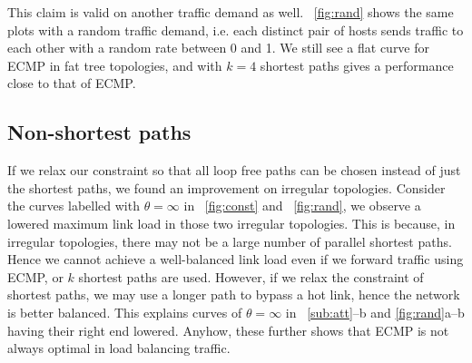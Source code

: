 \documentclass[conference]{IEEEtran}
\begin{document}
This claim is valid on another traffic demand as well.
\figurename~\ref{fig:rand} shows the same plots with a random traffic demand,
i.e. each distinct pair of hosts sends traffic to each other with a random rate
between 0 and 1. We still see a flat curve for ECMP in fat tree topologies, and
with $k=4$ shortest paths gives a performance close to that of ECMP.

%

\subsection{Non-shortest paths}\label{sub:nonshort}

If we relax our constraint so that all loop free paths can be chosen instead of
just the shortest paths, we found an improvement on irregular topologies.
Consider the curves labelled with $\theta=\infty$ in
\figurename~\ref{fig:const} and \figurename~\ref{fig:rand}, we observe a
lowered maximum link load in those two irregular topologies. This is because,
in irregular topologies, there may not be a large number of parallel shortest
paths. Hence we cannot achieve a well-balanced link load even if we forward
traffic using ECMP, or $k$ shortest paths are used. However, if we relax the
constraint of shortest paths, we may use a longer path to bypass a hot link,
hence the network is better balanced. This explains curves of $\theta=\infty$
in \figurename~\ref{sub:att}--b and \ref{fig:rand}a--b having their right end
lowered. Anyhow, these further shows that ECMP is not always optimal in load
balancing traffic.
\end{document}
